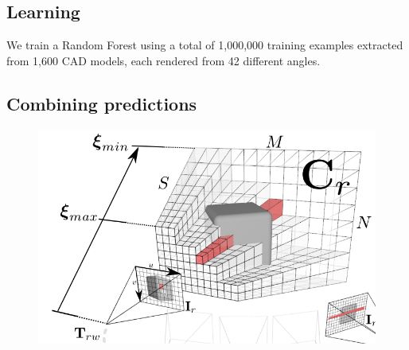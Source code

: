 \documentclass[10pt,twocolumn,letterpaper]{article}
\newcommand{\point}{\mathbf{p}}
\begin{document}






\subsection{Learning}

We train a Random Forest using a total of 1,000,000 training examples extracted from 1,600 CAD models, each rendered from 42 different angles.


\subsection{Combining predictions}

\begin{figure}
    \centering%
    \includegraphics[width=1.0\columnwidth]{dtam_voxels.png}%
    \label{fig:dtam_voxels}%
\end{figure}
\end{document}
